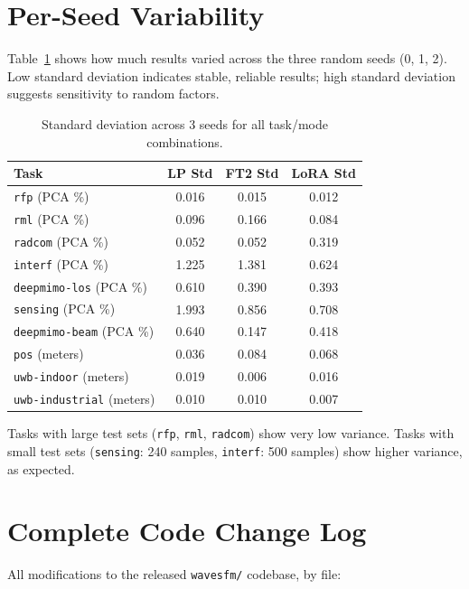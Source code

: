 \documentclass[11pt]{article}
\newcommand{\code}[1]{\texttt{#1}}
\begin{document}
\section{Per-Seed Variability}
\label{app:seeds}

Table~\ref{tab:seed_std} shows how much results varied across the three random seeds (0, 1, 2). Low standard deviation indicates stable, reliable results; high standard deviation suggests sensitivity to random factors.

\begin{table}[H]
\centering
\caption{Standard deviation across 3 seeds for all task/mode combinations.}
\label{tab:seed_std}
\small
\begin{tabular}{lccc}
\toprule
\textbf{Task} & \textbf{LP Std} & \textbf{FT2 Std} & \textbf{LoRA Std} \\
\midrule
\code{rfp} (PCA \%)            & 0.016 & 0.015 & 0.012 \\
\code{rml} (PCA \%)            & 0.096 & 0.166 & 0.084 \\
\code{radcom} (PCA \%)         & 0.052 & 0.052 & 0.319 \\
\code{interf} (PCA \%)         & 1.225 & 1.381 & 0.624 \\
\code{deepmimo-los} (PCA \%)   & 0.610 & 0.390 & 0.393 \\
\code{sensing} (PCA \%)        & 1.993 & 0.856 & 0.708 \\
\code{deepmimo-beam} (PCA \%)  & 0.640 & 0.147 & 0.418 \\
\code{pos} (meters)            & 0.036 & 0.084 & 0.068 \\
\code{uwb-indoor} (meters)     & 0.019 & 0.006 & 0.016 \\
\code{uwb-industrial} (meters) & 0.010 & 0.010 & 0.007 \\
\bottomrule
\end{tabular}
\end{table}

Tasks with large test sets (\code{rfp}, \code{rml}, \code{radcom}) show very low variance. Tasks with small test sets (\code{sensing}: 240 samples, \code{interf}: 500 samples) show higher variance, as expected.

\section{Complete Code Change Log}
\label{app:code_changes}

All modifications to the released \code{wavesfm/} codebase, by file:
\end{document}
